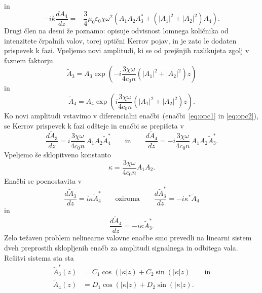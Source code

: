 in 
\begin{equation}
-i k \frac{dA_4}{dz} = - \frac{3}{4} \mu_0\varepsilon_0 \chi \omega^2 
\left( A_1 A_2 A_3^*+ (|A_1|^2 + |A_2|^2) A_4 \right)\!.
\label{eq:opc2}
\end{equation}
Drugi člen na desni že poznamo: opisuje odvisnost lomnega količnika
od intenzitete črpalnih valov, torej optični Kerrov
pojav, in je zato le dodaten prispevek
k fazi. Vpeljemo novi amplitudi, ki se od prejšnjih razlikujeta zgolj v faznem faktorju.
\begin{equation}
\tilde{A}_3 = A_3 \exp\left(-i\frac{ 3 \chi \omega}{4 c_0 n}(|A_1|^2 + |A_2|^2) z\right)
\end{equation}
in 
\begin{equation}
\tilde{A}_4 = A_4 \exp\left(i\frac{ 3 \chi \omega}{4 c_0 n}(|A_1|^2 + |A_2|^2)z\right)\!.
\end{equation}
Ko novi amplitudi vstavimo v diferencialni enačbi~(enačbi~\ref{eq:opc1} in 
\ref{eq:opc2}), se Kerrov prispevek k fazi odšteje
in enačbi se prepišeta v 
\begin{equation}
\frac{d\tilde{A}_{3}}{dz}=i\frac{ 3 \chi \omega}{4 c_0 n}\,
A_{1}A_{2}\tilde{A}_{4}^{*} \qquad \textrm{in} \qquad 
\frac{d\tilde{A}_{4}}{dz}=-i\frac{ 3 \chi \omega}{4 c_0 n}\,
A_{1}A_{2}\tilde{A}_{3}^*.
\label{8.105}
\end{equation}
Vpeljemo še sklopitveno konstanto
\begin{equation}
\kappa=\frac{ 3 \chi \omega}{4 c_0 n}A_1 A_2.
\label{8.106}
\end{equation}
Enačbi se poenostavita v 
\begin{equation}
\frac{d\tilde{A}_{3}}{dz}=i\kappa \tilde{A}_{4}^{*} \qquad
\textrm{oziroma} \qquad \frac{d\tilde{A}^*_{3}}{dz}=-i\kappa^* \tilde{A}_{4} 
\label{8.107}
\end{equation}
in
\begin{equation}
\frac{d\tilde{A}_{4}}{dz}=-i\kappa \tilde{A}_{3}^*.
\label{8.107a}
\end{equation}
Zelo težaven problem nelinearne valovne enačbe smo prevedli na linearni
sistem dveh preprostih sklopljenih enačb za amplitudi signalnega in
odbitega vala. Rešitvi sistema sta
sta 
\begin{align}
\tilde{A}_3^* \left(z\right) & =  C_{1}\cos(\left|\kappa\right|z)+
C_{2}\sin(\left|\kappa\right|z)
\label{8.108} \qquad \mathrm{in}\\
\tilde{A}_4 \left(z\right) & =  D_{1}\cos(\left|\kappa\right|z)+
D_{2}\sin(\left|\kappa\right|z).
\label{8.108a}
\end{align}
